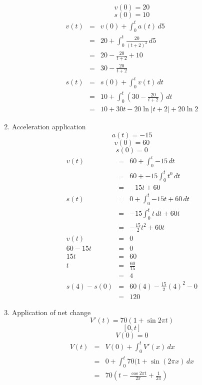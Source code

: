 \documentclass{article}
\begin{document}
\begin{enumerate}
        $$v(0) = 20$$
        $$s(0) = 10$$
        \begin{eqnarray}
            v(t) &=& v(0) + \int_0^t{a(t)\,d5} \\
                 &=& 20 + \int_0^t{\frac{20}{\left(t + 2\right)^2}\,d5} \\
                 &=& 20 - \frac{20}{t + 2} + 10 \\
                 &=& 30 - \frac{20}{t + 2} \\
            s(t) &=& s(0) + \int_0^t{v(t)\,dt} \\
                 &=& 10 + \int_0^t{\left(30 - \frac{20}{t + 2}\right)\,dt} \\
                 &=& 10 + 30t - 20\ln{|t + 2|} + 20\ln{2}
        \end{eqnarray}
    \item Acceleration application
        $$a(t) = -15$$
        $$v(0) = 60$$
        $$s(0) = 0$$
        \begin{eqnarray}
            v(t) &=& 60 + \int_0^t{-15\,dt} \\
                 &=& 60 + -15\int_0^t{t^0\,dt} \\
                 &=& -15t + 60 \\
            s(t) &=& 0 + \int_0^t{-15t + 60\,dt} \\
                 &=& -15\int_0^t{t\,dt} + 60t \\
                 &=& -\frac{15}{2}t^2 + 60t \\
            v(t) &=& 0 \\
            60 - 15t &=& 0 \\
            15t &=& 60 \\
            t &=& \frac{60}{15} \\
              &=& 4 \\
            s(4) - s(0) &=& 60(4) - \frac{15}{2}(4)^2 - 0 \\
                        &=& 120
        \end{eqnarray}
    \item Application of net change
        $$V'(t) = 70(1 + \sin{2\pi t})$$
        $$[0,t]$$
        $$V(0) = 0$$
        \begin{eqnarray}
            V(t) &=& V(0) + \int_0^t{V'(x)\,dx} \\
                 &=& 0 + \int_0^t{70(1 + \sin{(2\pi x)}\,dx} \\
                 &=& 70\left(t - \frac{\cos{2\pi t}}{2\pi} + \frac{1}{2\pi}\right) \\

\end{eqnarray}
\end{enumerate}
\end{document}
